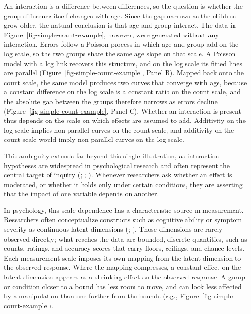 \documentclass[
  man,
  floatsintext,
  longtable,
  nolmodern,
  notxfonts,
  notimes,
  colorlinks=true,linkcolor=blue,citecolor=blue,urlcolor=blue]{apa7}
\begin{document}
An interaction is a difference between differences, so the question is
whether the group difference itself changes with age. Since the gap
narrows as the children grow older, the natural conclusion is that age
and group interact. The data in Figure~\ref{fig-simple-count-example},
however, were generated without any interaction. Errors follow a Poisson
process in which age and group add on the log scale, so the two groups
share the same age slope on that scale. A Poisson model with a log link
recovers this structure, and on the log scale its fitted lines are
parallel (Figure~\ref{fig-simple-count-example}, Panel B). Mapped back
onto the count scale, the same model produces two curves that converge
with age, because a constant difference on the log scale is a constant
ratio on the count scale, and the absolute gap between the groups
therefore narrows as errors decline
(Figure~\ref{fig-simple-count-example}, Panel C). Whether an interaction
is present thus depends on the scale on which effects are assumed to
add. Additivity on the log scale implies non-parallel curves on the
count scale, and additivity on the count scale would imply non-parallel
curves on the log scale.

This ambiguity extends far beyond this single illustration, as
interaction hypotheses are widespread in psychological research and
often represent the central target of inquiry
(;
;
). Whenever researchers
ask whether an effect is moderated, or whether it holds only under
certain conditions, they are asserting that the impact of one variable
depends on another.

In psychology, this scale dependence has a characteristic source in
measurement. Researchers often conceptualize constructs such as
cognitive ability or symptom severity as continuous latent dimensions
(;
). Those
dimensions are rarely observed directly; what reaches the data are
bounded, discrete quantities, such as counts, ratings, and accuracy
scores that carry floors, ceilings, and chance levels. Each measurement
scale imposes its own mapping from the latent dimension to the observed
response. Where the mapping compresses, a constant effect on the latent
dimension appears as a shrinking effect on the observed response. A
group or condition closer to a bound has less room to move, and can look
less affected by a manipulation than one farther from the bounds (e.g.,
Figure~\ref{fig-simple-count-example}).
\end{document}

